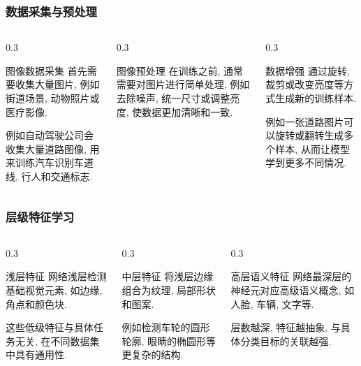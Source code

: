 \documentclass[aspectratio=169]{ctexbeamer}
\begin{document}
\begin{frame}
	\frametitle{数据采集与预处理}
	\begin{columns}[t]
		\begin{column}{0.3\linewidth}
			\begin{block}{图像数据采集}
				首先需要收集大量图片, 例如街道场景, 动物照片或医疗影像.

				例如自动驾驶公司会收集大量道路图像, 用来训练汽车识别车道线, 行人和交通标志.
			\end{block}
		\end{column}
		\begin{column}{0.3\linewidth}
			\begin{block}{图像预处理}
				在训练之前, 通常需要对图片进行简单处理, 例如去除噪声, 统一尺寸或调整亮度, 使数据更加清晰和一致.
			\end{block}
		\end{column}
		\begin{column}{0.3\linewidth}
			\begin{block}{数据增强}
				通过旋转, 裁剪或改变亮度等方式生成新的训练样本.

				例如一张道路图片可以旋转或翻转生成多个样本, 从而让模型学到更多不同情况.
			\end{block}
		\end{column}
	\end{columns}
\end{frame}

\begin{frame}
	\frametitle{层级特征学习}
	\begin{columns}[t]
		\begin{column}{0.3\linewidth}
			\begin{block}{浅层特征}
				网络浅层检测基础视觉元素, 如边缘, 角点和颜色块.

				这些低级特征与具体任务无关, 在不同数据集中具有通用性.
			\end{block}
		\end{column}
		\begin{column}{0.3\linewidth}
			\begin{block}{中层特征}
				将浅层边缘组合为纹理, 局部形状和图案.

				例如检测车轮的圆形轮廓, 眼睛的椭圆形等更复杂的结构.
			\end{block}
		\end{column}
		\begin{column}{0.3\linewidth}
			\begin{block}{高层语义特征}
				网络最深层的神经元对应高级语义概念, 如人脸, 车辆, 文字等.

				层数越深, 特征越抽象, 与具体分类目标的关联越强.
			\end{block}
		\end{column}
	\end{columns}
\end{frame}
\end{document}
